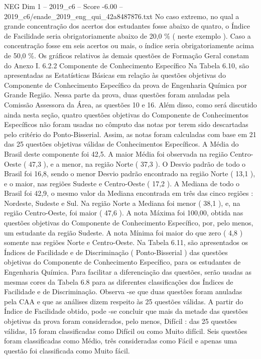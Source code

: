 \begin{textsample}{NEG Dim 1 – 2019\_c6 – Score -6.00 – 2019\_c6/enade\_2019\_eng\_qui\_42a8487876.txt}
No caso extremo, no qual a grande concentração dos acertos dos estudantes fosse abaixo de quatro, o Índice de Facilidade seria obrigatoriamente abaixo de 20,0 \% ( neste exemplo ).
Caso a concentração fosse em seis acertos ou mais, o índice seria obrigatoriamente acima de 50,0 \%.
Os gráficos relativos às demais questões de Formação Geral constam do Anexo I. 6.2.2 Componente de Conhecimento Específico Na Tabela 6.10, são apresentadas as Estatísticas Básicas em relação às questões objetivas do Componente de Conhecimento Específico da prova de Engenharia Química por Grande Região.
Nessa parte da prova, duas questões foram anuladas pela Comissão Assessora da Área, as questões 10 e 16.
Além disso, como será discutido ainda nesta seção, quatro questões objetivas do Componente de Conhecimentos Específicos não foram usadas no cômputo das notas por terem sido descartadas pelo critério do Ponto-Bisserial.
Assim, as notas foram calculadas com base em 21 das 25 questões objetivas válidas de Conhecimentos Específicos.
A Média do Brasil deste componente foi 42,5.
A maior Média foi observada na região Centro-Oeste ( 47,3 ), e a menor, na região Norte ( 37,3 ).
O Desvio padrão de todo o Brasil foi 16,8, sendo o menor Desvio padrão encontrado na região Norte ( 13,1 ), e o maior, nas regiões Sudeste e Centro-Oeste ( 17,2 ).
A Mediana de todo o Brasil foi 42,9, o mesmo valor da Mediana encontrada em três das cinco regiões : Nordeste, Sudeste e Sul.
Na região Norte a Mediana foi menor ( 38,1 ), e, na região Centro-Oeste, foi maior ( 47,6 ).
A nota Máxima foi 100,00, obtida nas questões objetivas do Componente de Conhecimento Específico, por, pelo menos, um estudante da região Sudeste.
A nota Mínima foi maior do que zero ( 4,8 ) somente nas regiões Norte e Centro-Oeste.
Na Tabela 6.11, são apresentados os Índices de Facilidade e de Discriminação ( Ponto-Bisserial ) das questões objetivas do Componente de Conhecimento Específico, para os estudantes de Engenharia Química.
Para facilitar a diferenciação das questões, serão usadas as mesmas cores da Tabela 6.8 para as diferentes classificações dos Índices de Facilidade e de Discriminação.
Observa -se que duas questões foram anuladas pela CAA e que as análises dizem respeito às 25 questões válidas.
A partir do Índice de Facilidade obtido, pode -se concluir que mais da metade das questões objetivas da prova foram considerados, pelo menos, Difícil : das 25 questões válidas, 15 foram classificadas como Difícil ou como Muito difícil.
Seis questões foram classificadas como Médio, três consideradas como Fácil e apenas uma questão foi classificada como Muito fácil.

\end{textsample}
